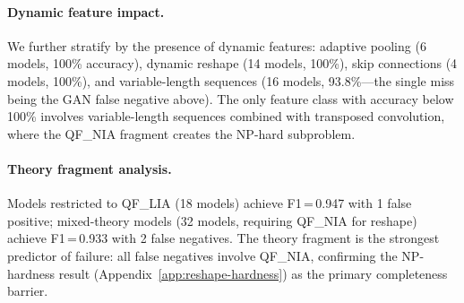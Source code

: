 \documentclass[11pt]{article}
\begin{document}
\paragraph{Dynamic feature impact.}
We further stratify by the presence of dynamic features:
adaptive pooling (6 models, 100\% accuracy),
dynamic reshape (14 models, 100\%),
skip connections (4 models, 100\%),
and variable-length sequences (16 models, 93.8\%---the single
miss being the GAN false negative above).
The only feature class with accuracy below 100\% involves
variable-length sequences combined with transposed convolution,
where the QF\_NIA fragment creates the NP-hard subproblem.

\paragraph{Theory fragment analysis.}
Models restricted to QF\_LIA (18 models) achieve F1\,=\,0.947
with 1 false positive; mixed-theory models (32 models, requiring
QF\_NIA for reshape) achieve F1\,=\,0.933 with 2 false negatives.
The theory fragment is the strongest predictor of failure:
all false negatives involve QF\_NIA, confirming the NP-hardness
result (Appendix~\ref{app:reshape-hardness}) as the primary
completeness barrier.
\end{document}
